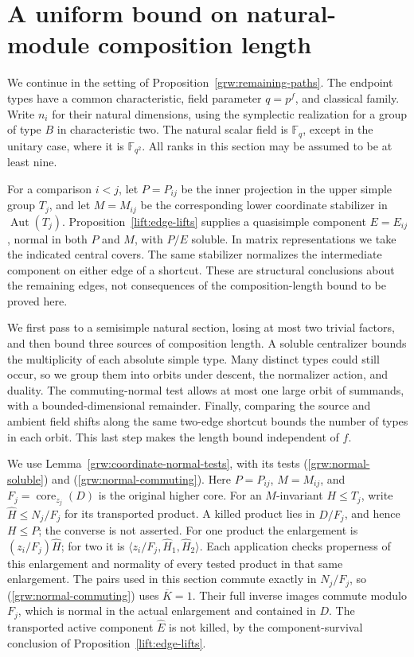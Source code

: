 \section{A uniform bound on natural-module composition length}
\label{pkt:section}

We continue in the setting of Proposition~\ref{grw:remaining-paths}.
The endpoint types have a common characteristic, field parameter
$q=p^f$, and classical family.  Write $n_i$ for their natural
dimensions, using the symplectic realization for a group of type
$B$ in characteristic two.  The natural scalar field is
$\mathbb F_q$, except in the unitary case, where it is
$\mathbb F_{q^2}$.  All ranks in this section may be assumed to be
at least nine.

For a comparison $i<j$, let $P=P_{ij}$ be the inner projection
in the upper simple group $T_j$, and let $M=M_{ij}$ be the
corresponding lower coordinate stabilizer in
$\operatorname{Aut}(T_j)$.  Proposition~\ref{lift:edge-lifts} supplies a
quasisimple component $E=E_{ij}$, normal in both $P$ and $M$, with
$P/E$ soluble.  In matrix representations we take the indicated
central covers.  The same stabilizer normalizes the intermediate
component on either edge of a shortcut.  These are structural
conclusions about the remaining edges, not consequences of the
composition-length bound to be proved here.

We first pass to a semisimple natural section, losing at most two trivial
factors, and then bound three sources of composition length.  A soluble
centralizer bounds the multiplicity of each absolute simple type.
Many distinct types could still occur, so we group them into orbits under
descent, the normalizer action, and duality.  The commuting-normal test
allows at most one large orbit of summands, with a bounded-dimensional
remainder.  Finally, comparing the source and ambient field shifts along
the same two-edge shortcut bounds the number of types in each orbit.
This last step makes the length bound independent of $f$.

We use Lemma~\ref{grw:coordinate-normal-tests}, with its tests
\textup{(\ref{grw:normal-soluble})} and
\textup{(\ref{grw:normal-commuting})}.
Here $P=P_{ij}$, $M=M_{ij}$, and
$F_j=\operatorname{core}_{z_j}(D)$ is the original higher core.
For an $M$-invariant $H\le T_j$, write
$\widehat H\le N_j/F_j$ for its transported product.
A killed product lies in $D/F_j$, and hence $H\le P$;
the converse is not asserted.
For one product the enlargement is
$(z_i/F_j)\widehat H$; for two it is
$\langle z_i/F_j,\widehat H_1,\widehat H_2\rangle$.
Each application checks properness of this enlargement and
normality of every tested product in that same enlargement.
The pairs used in this section commute exactly in $N_j/F_j$,
so \textup{(\ref{grw:normal-commuting})} uses $\overline K=1$.
Their full inverse images commute modulo $F_j$, which is
normal in the actual enlargement and contained in $D$.
The transported active component $\widehat E$ is not killed,
by the component-survival conclusion of
Proposition~\ref{lift:edge-lifts}.

